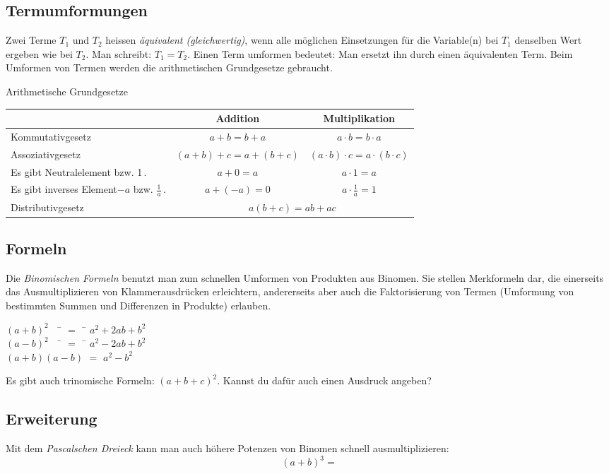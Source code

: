 \subsection*{Termumformungen}
Zwei Terme $T_1$ und $T_2$ heissen \emph{äquivalent (gleichwertig)}, wenn alle möglichen Einsetzungen für die Variable(n) bei $T_1$ denselben Wert ergeben wie bei $T_2$.
Man schreibt: $T_1 = T_2$.
\vspace{5mm}
Einen Term umformen bedeutet:
Man ersetzt ihn durch einen äquivalenten Term. Beim Umformen von Termen werden die arithmetischen Grundgesetze gebraucht.

\begin{law}{Arithmetische Grundgesetze}
    \bgroup
    \def\arraystretch{2.5}
	\begin{tabularx}{\linewidth}{|X|c|c|}
			\hline
			 & Addition & Multiplikation \\
			\hline
			Kommutativgesetz & $a+b=b+a$ & $a\cdot b = b\cdot a$ \\
			
			Assoziativgesetz & $(a+b)+c = a+ (b+c)$ & $(a\cdot b)\cdot c = a\cdot (b\cdot c)$ \\
			
			Es gibt Neutralelement\newline 0 bzw. 1\,. & $a+0 = a$ & $a\cdot 1 = a$ \\
			
			Es gibt inverses Element\newline $-a$ bzw. $\displaystyle \frac{1}{a}$\,. & $a+(-a) = 0$ & $\displaystyle a\cdot \frac{1}{a} = 1$ \\
			\hline
			Distributivgesetz & \multicolumn{2}{c|}{$a(b+c)=ab+ac$} \\
			\hline
    \end{tabularx}
    \egroup
\end{law}

\subsection*{Formeln}
Die \emph{Binomischen Formeln} benutzt man zum schnellen Umformen von Produkten aus Binomen.
Sie stellen Merkformeln dar, die einerseits das Ausmultiplizieren von Klammerausdrücken erleichtern, andererseits aber auch die Faktorisierung von Termen (Umformung von bestimmten Summen und Differenzen in Produkte) erlauben.

\begin{tcolorbox}[colback=blue!7!white,colframe=blue!60!black,title=Binomische Formeln]
	\begin{tabbing}
		$(a+b)^2$ \qquad \, \, \= $=$ \, \= $a^2+2ab+b^2$ \\
		$(a-b)^2$ \qquad \, \, \= $=$ \, \= $a^2-2ab+b^2$ \\
		$(a+b)(a-b)$ \> $=$ \> $a^2-b^2$
	\end{tabbing}
\end{tcolorbox} 

Es gibt auch trinomische Formeln: $(a+b+c)^2$. Kannst du dafür auch einen Ausdruck angeben?
\vspace{2cm}

\subsection*{Erweiterung}
Mit dem \emph{Pascalschen Dreieck} kann man auch höhere Potenzen von Binomen schnell ausmultiplizieren:
\[
	(a+b)^3 =
\]





